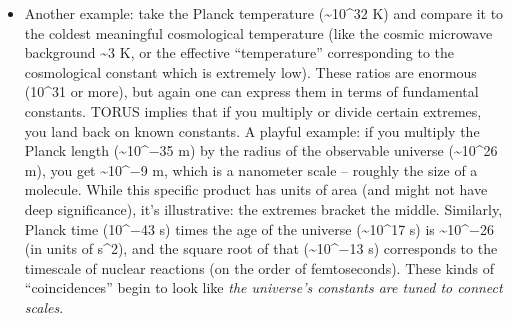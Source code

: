 \documentclass[
]{article}
\begin{document}
\begin{itemize}
{  scale multiply or relate to give moderate values}. Consider the age of
  the universe versus the Planck time:
  T\textless sub\textgreater U\textless/sub\textgreater/t\textless sub\textgreater P\textless/sub\textgreater{}
  \textasciitilde{} 8×10\^{}60. If this were just a random huge number,
  one might shrug. But TORUS factorizes this: 8×10\^{}60 ≈ (10\^{}2) ×
  (10\^{}38) × (10\^{}20)\hspace{0pt}. Each factor has a physical
  meaning: 10\^{}2 is \textasciitilde137, close to 1/α (the 0D
  coupling's inverse)\hspace{0pt}; 10\^{}38 is in the ballpark of the
  ratio of electromagnetic to gravitational coupling for typical
  particles (since gravity is \textasciitilde10\^{}38 times
  weaker)\hspace{0pt}; 10\^{}20 might relate to number of particles or
  entropy in a large system. The exact interpretation can vary, but the
  point remains -- these large dimensionless numbers decompose into
  \textbf{products of fundamental ratios} rather than being sui generis.
  TORUS thereby \textbf{demystifies large numbers}: they're harmonics of
  the smaller numbers. In music, this is like hearing a very low bass
  note and realizing it's actually a combination of higher-frequency
  harmonics you already know. By showing that a huge number like
  10\^{}60 can come from α\^{}−1 (\textasciitilde10\^{}2) times other
  known quantities, TORUS suggests the cosmic scale is in resonance with
  the quantum scales\hspace{0pt}.
\item
  Another example: take the Planck temperature (\textasciitilde10\^{}32
  K) and compare it to the coldest meaningful cosmological temperature
  (like the cosmic microwave background \textasciitilde3 K, or the
  effective ``temperature'' corresponding to the cosmological constant
  which is extremely low). These ratios are enormous (10\^{}31 or more),
  but again one can express them in terms of fundamental constants.
  TORUS implies that if you multiply or divide certain extremes, you
  land back on known constants. A playful example: if you multiply the
  Planck length (\textasciitilde10\^{}−35 m) by the radius of the
  observable universe (\textasciitilde10\^{}26 m), you get
  \textasciitilde10\^{}−9 m, which is a nanometer scale -- roughly the
  size of a molecule. While this specific product has units of area (and
  might not have deep significance), it's illustrative: the extremes
  bracket the middle. Similarly, Planck time (10\^{}−43 s) times the age
  of the universe (\textasciitilde10\^{}17 s) is
  \textasciitilde10\^{}−26 (in units of s\^{}2), and the square root of
  that (\textasciitilde10\^{}−13 s) corresponds to the timescale of
  nuclear reactions (on the order of femtoseconds). These kinds of
  ``coincidences'' begin to look like \emph{the universe's constants are
  tuned to connect scales}.
\end{itemize}
\end{document}
